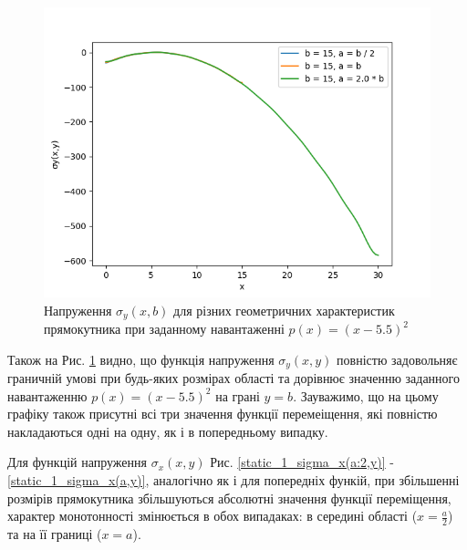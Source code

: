 \begin{figure}[H]
    \begin{center}
        \includegraphics[scale=0.6]{images/results/static_1/sigma_y(x,b).png}
        \caption{Напруження $\sigma_y(x, b)$ для різних геометричних характеристик прямокутника при заданному навантаженні $p(x) = (x - 5.5)^2$}\label{static_1_sigma_y(x,b)}
    \end{center}
\end{figure}

Також на Рис. \ref{static_1_sigma_y(x,b)} видно, що функція напруження $\sigma_y(x,y)$ повністю задовольняє граничній умові при будь-яких розмірах області
та дорівнює значенню заданного навантаженню $p(x) = (x - 5.5)^2$ на грані $y=b$.
Зауважимо, що на цьому графіку також присутні всі три значення функції перемеіщення,
які повністю накладаються одні на одну,
як і в попередньому випадку.

Для функцій напруження $\sigma_x(x, y)$ Рис. \ref{static_1_sigma_x(a:2,y)} - \ref{static_1_sigma_x(a,y)},
аналогічно як і для попередніх функій,
при збільшенні розмірів прямокутника збільшуються абсолютні значення функції переміщення,
характер монотонності змінюється в обох випадаках: в середині області ($x=\frac{a}{2}$) та на її границі ($x=a$).

